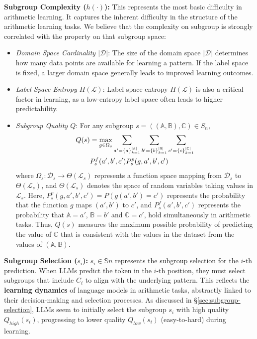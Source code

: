 \documentclass[11pt]{article}
\begin{document}
\textbf{Subgroup Complexity ($h(\cdot)$):} This represents the most basic difficulty in arithmetic learning. It captures the inherent difficulty in the structure of the arithmetic learning tasks. We believe that the complexity on subgroup is strongly correlated with the property on that subgroup space:
\begin{itemize}

    \item \textit{Domain Space Cardinality \( |\mathcal{D}| \)}: The size of the domain space \( |\mathcal{D}| \) determines how many data points are available for learning a pattern. If the label space is fixed, a larger domain space generally leads to improved learning outcomes.

    \item \textit{Label Space Entropy \( H(\mathcal{L}) \)}: Label space entropy \( H(\mathcal{L}) \) is also a critical factor in learning, as a low-entropy label space often leads to higher predictability.
    \item \textit{Subgroup Quality $Q$}: For any subgroup \( s=((\mathbb{A},\mathbb{B}),\mathbb{C}) \in S_n \),
 \begin{align}
 \vspace{-0.2cm}
    Q(s) &=\max_{g \in \Omega_s} \sum_{a'=\{a\}_{k=1}^{|\mathbb{A}|}} \sum_{b'=\{b\}_{k=1}^{|\mathbb{B}|}} \sum_{c'=\{c\}_{k=1}^{|\mathbb{C}|}}\notag\\
    & P_s^f(a',b',c') P_s^p(g,a',b',c')
\vspace{-0.2cm}
\end{align}
    where \(\Omega_s: \mathcal{D}_s \to \Theta(\mathcal{L}_s)\) represents a function space mapping from \(\mathcal{D}_s\) to \(\Theta(\mathcal{L}_s)\), and \(\Theta(\mathcal{L}_s)\) denotes the space of random variables taking values in \(\mathcal{L}_s\).  Here, \( P_s^p(g, a',b',c') = P(g(a',b') = c') \) represents the probability that the function \( g \) maps \( (a',b') \) to \( c' \), and \( P_s^f(a', b', c') \) represents the probability that  \( \mathbb{A} = a' \), \( \mathbb{B} = b' \) and \( \mathbb{C} = c' \), hold simultaneously in arithmetic tasks. Thus, \( Q(s) \) measures the maximum possible probability of predicting the value of \( \mathbb{C} \) that is consistent with the values in the dataset from the values of \( (\mathbb{A}, \mathbb{B}) \).
\end{itemize}
\textbf{Subgroup Selection ($s_i$):} $s_i \in \mathbb{S}n$ represents the subgroup selection for the $i$-th prediction. When LLMs predict the token in the $i$-th position, they must select subgroups that include $C_i$ to align with the underlying pattern. This reflects the \textbf{learning dynamics} of language models in arithmetic tasks, abstractly linked to their decision-making and selection processes. As discussed in \S\ref{sec:subgroup-selection}, LLMs seem to initially select the subgroup $s_i$ with high quality $Q_{high}(s_i)$, progressing to lower quality $Q_{low}(s_i)$ (easy-to-hard) during learning.
\end{document}
